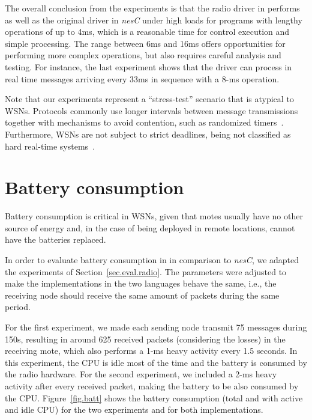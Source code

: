 
The overall conclusion from the experiments is that the radio driver in \CEU 
performs as well as the original driver in \emph{nesC} under high loads for 
programs with lengthy operations of up to 4ms, which is a reasonable time for 
control execution and simple processing.
%
The range between 6ms and 16ms offers opportunities for performing more complex 
operations, but also requires careful analysis and testing.
%
For instance, the last experiment shows that the \CEU driver can process in 
real time messages arriving every 33ms in sequence with a 8-ms operation.
%

Note that our experiments represent a ``stress-test'' scenario that is atypical 
to WSNs.
Protocols commonly use longer intervals between message transmissions together 
with mechanisms to avoid contention, such as randomized 
timers~\cite{wsn.trickle,wsn.ctp}.
Furthermore, WSNs are not subject to strict deadlines, being not classified as 
hard real-time systems~\cite{wsn.decade}.

\section{Battery consumption}
\label{sec.eval.batt}

Battery consumption is critical in WSNs, given that motes usually have no other 
source of energy and, in the case of being deployed in remote locations, cannot 
have the batteries replaced.

In order to evaluate battery consumption in \CEU in comparison to \emph{nesC}, 
we adapted the experiments of Section~\ref{sec.eval.radio}.
%
The parameters were adjusted to make the implementations in the two languages 
behave the same, i.e., the receiving node should receive the same amount of 
packets during the same period.

For the first experiment, we made each sending node transmit 75 messages 
during 150s, resulting in around 625 received packets (considering the 
losses) in the receiving mote, which also performs a 1-ms heavy activity 
every 1.5 seconds.
%
In this experiment, the CPU is idle most of the time and the battery is 
consumed by the radio hardware.
%
For the second experiment, we included a 2-ms heavy activity after every 
received packet, making the battery to be also consumed by the CPU.
%
Figure~\ref{fig.batt} shows the battery consumption (total and with active and 
idle CPU) for the two experiments and for both implementations.

